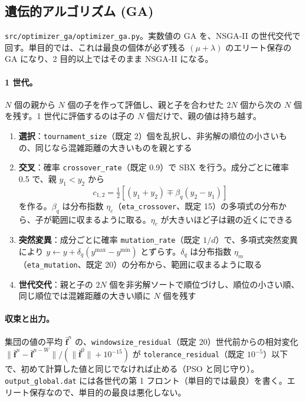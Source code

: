 \documentclass[11pt,a4paper,dvipdfmx]{jsarticle}
\begin{document}
\subsection{遺伝的アルゴリズム (GA)}\label{sec:ga}

\texttt{src/optimizer\_ga/optimizer\_ga.py}。実数値の GA を、NSGA-II \cite{deb2002} の世代交代で回す。単目的では、これは最良の個体が必ず残る $(\mu + \lambda)$ のエリート保存の GA になり、2 目的以上ではそのまま NSGA-II になる。

\paragraph{1 世代。} $N$ 個の親から $N$ 個の子を作って評価し、親と子を合わせた $2N$ 個から次の $N$ 個を残す。1 世代に評価するのは子の $N$ 個だけで、親の値は持ち越す。

\begin{enumerate}
\item \textbf{選択}：\texttt{tournament\_size}（既定 2）個を乱択し、非劣解の順位の小さいもの、同じなら混雑距離の大きいものを親とする
\item \textbf{交叉}：確率 \texttt{crossover\_rate}（既定 0.9）で SBX \cite{deb1995} を行う。成分ごとに確率 0.5 で、親 $y_1 < y_2$ から
\begin{equation}
  c_{1,2} = \tfrac{1}{2}\left[ (y_1 + y_2) \mp \beta_q (y_2 - y_1) \right]
\end{equation}
を作る。$\beta_q$ は分布指数 $\eta_c$（\texttt{eta\_crossover}、既定 15）の多項式の分布から、子が範囲に収まるように取る。$\eta_c$ が大きいほど子は親の近くにできる
\item \textbf{突然変異}：成分ごとに確率 \texttt{mutation\_rate}（既定 $1/d$）で、多項式突然変異 \cite{deb1996} により $y \leftarrow y + \delta_q (y^{\max} - y^{\min})$ とずらす。$\delta_q$ は分布指数 $\eta_m$（\texttt{eta\_mutation}、既定 20）の分布から、範囲に収まるように取る
\item \textbf{世代交代}：親と子の $2N$ 個を非劣解ソートで順位づけし、順位の小さい順、同じ順位では混雑距離の大きい順に $N$ 個を残す
\end{enumerate}

\paragraph{収束と出力。} 集団の値の平均 $\bar{\mathbf{f}}^n$ の、\texttt{windowsize\_residual}（既定 20）世代前からの相対変化 $\|\bar{\mathbf{f}}^n - \bar{\mathbf{f}}^{n-W}\| / (\|\bar{\mathbf{f}}^0\| + 10^{-15})$ が \texttt{tolerance\_residual}（既定 $10^{-5}$）以下で、初めて計算した値と同じでなければ止める（PSO と同じ守り）。\texttt{output\_global.dat} には各世代の第 1 フロント（単目的では最良）を書く。エリート保存なので、単目的の最良は悪化しない。
\end{document}
